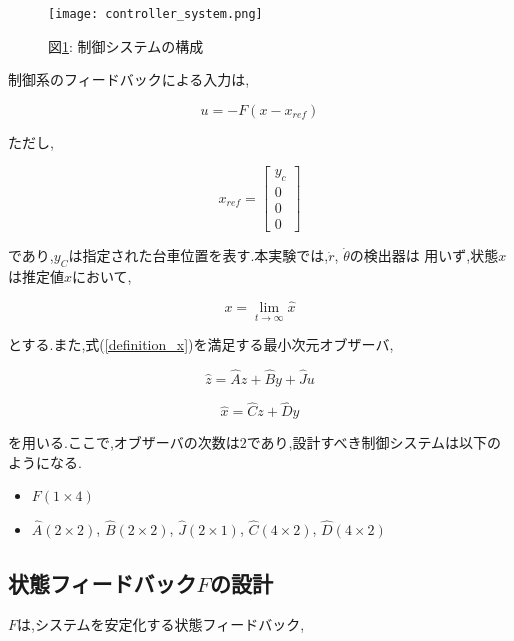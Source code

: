 \begin{figure}[htbp]
    \begin{center}
        \texttt{[image: controller\_system.png]}
        \caption{図\ref{controller_system}: 制御システムの構成}
        \label{controller_system}
    \end{center}
\end{figure}

制御系のフィードバックによる入力は,

$$
    u = -F \left( x - x_{ref} \right)
$$

ただし,

$$
    x_{ref} =
    \left[
        \begin{array}{c}
            y_{c} \\
            0 \\
            0 \\
            0
        \end{array}
    \right]
$$

であり,$y_{C}$は指定された台車位置を表す.本実験では,$\dot{r}$, $\dot{\theta}$の検出器は
用いず,状態$x$は推定値$\hat{x}$において,

\begin{equation}
    x = \lim_{t \to \infty} \hat{x}
    \label{definition_x}
\end{equation}

とする.また,式(\ref{definition_x})を満足する最小次元オブザーバ,

\begin{equation}
    \hat{z} = \hat{A}z + \hat{B}y + \hat{J}u
    \label{z_hat}
\end{equation}

\begin{equation}
    \hat{x} = \hat{C}z + \hat{D}y
    \label{x_hat}
\end{equation}

を用いる.ここで,オブザーバの次数は$2$であり,設計すべき制御システムは以下のようになる.

\begin{itemize}
    \item $F(1 \times 4)$
    \item $\hat{A}(2 \times 2)$, $\hat{B}(2 \times 2)$, 
    $\hat{J}(2 \times 1)$, $\hat{C}(4 \times 2)$, $\hat{D}(4 \times 2)$
\end{itemize}


\subsection{状態フィードバック$F$の設計}
$F$は,システムを安定化する状態フィードバック,

